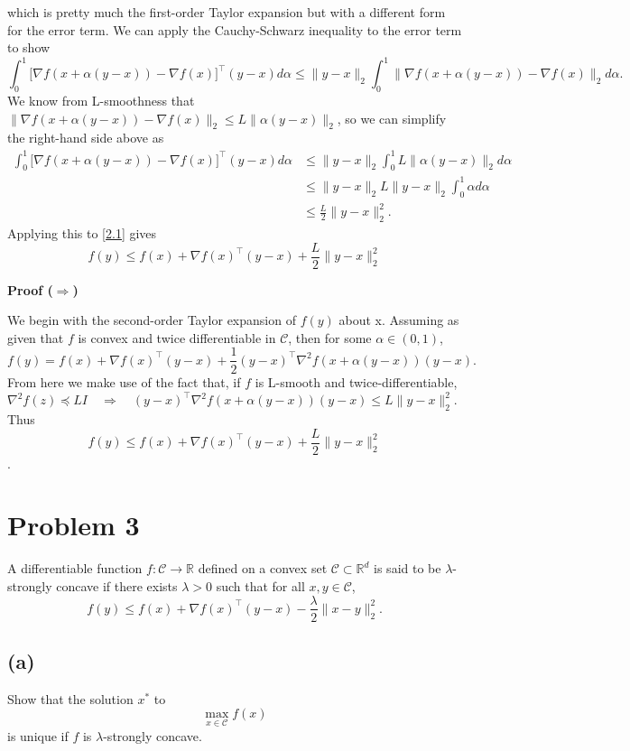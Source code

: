 \documentclass[11pt]{article}
\begin{document}
which is pretty much the first-order Taylor expansion but with a different form for the error term. We can apply the Cauchy-Schwarz inequality to the error term to show
\[
\int_0^1 \big[\nabla f(x + \alpha (y-x)) - \nabla f(x)\big]^\top (y-x) d\alpha \leq \|y-x\|_2 \int_0^1 \| \nabla f(x + \alpha (y-x)) - \nabla f(x) \|_2 d\alpha.
\]
We know from L-smoothness that $\| \nabla f(x + \alpha (y-x)) - \nabla f(x) \|_2 \leq L\|\alpha(y-x)\|_2$, so we can simplify the right-hand side above as
\begin{align*}
    \int_0^1 \big[\nabla f(x + \alpha (y-x)) - \nabla f(x)\big]^\top (y-x) d\alpha &\leq \|y-x\|_2 \int_0^1 L\|\alpha(y-x)\|_2 d\alpha \\
    &\leq \|y-x\|_2 L \|y-x\|_2 \int_0^1 \alpha d\alpha \\
    &\leq \frac{L}{2} \|y-x\|_2^2.
\end{align*}
Applying this to \ref{2.1} gives
\[
f(y) \leq f(x) + \nabla f(x)^\top (y-x) + \frac{L}{2} \|y-x\|_2^2
\]

\textbf{Proof ($\Rightarrow$)}

We begin with the second-order Taylor expansion of $f(y)$ about x. Assuming as given that $f$ is convex and twice differentiable in $\mathcal{C}$, then for some $\alpha \in (0,1)$,
\[
f(y) = f(x) + \nabla f(x)^\top (y-x) + \frac{1}{2}(y-x)^\top \nabla^2 f(x+\alpha(y-x)) (y-x).
\]
From here we make use of the fact that, if $f$ is L-smooth and twice-differentiable,  $\nabla^2 f(z) \preceq LI \quad \Rightarrow \quad (y-x)^\top \nabla^2 f(x + \alpha(y-x)) (y-x) \leq L\|y-x\|_2^2$. Thus
\[
f(y) \leq f(x) + \nabla f(x)^\top (y-x) + \frac{L}{2}\|y-x\|_2^2
\].

\hrulefill

\section*{Problem 3}

A differentiable function $f : \mathcal{C} \to \mathbb{R}$ defined on a convex set
$\mathcal{C} \subset \mathbb{R}^d$ is said to be $\lambda$-strongly concave if there exists $\lambda > 0$
such that for all $x, y \in \mathcal{C}$,
\[
f(y) \le f(x) + \nabla f(x)^\top (y - x) - \frac{\lambda}{2}\|x - y\|_2^2.
\]

\subsection*{(a)}

Show that the solution $x^*$ to
\[
\max_{x \in \mathcal{C}} f(x)
\]
is unique if $f$ is $\lambda$-strongly concave.
\end{document}
